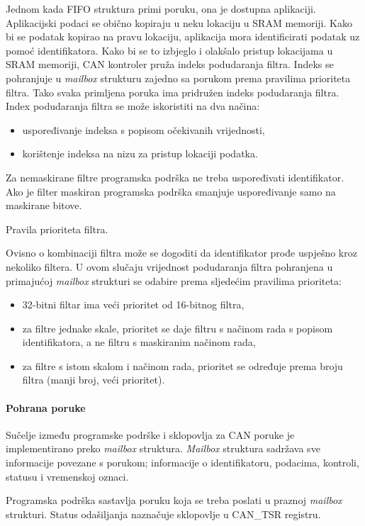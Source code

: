 Jednom kada FIFO struktura primi poruku, ona je dostupna aplikaciji. Aplikacijski podaci se obično kopiraju u neku lokaciju u SRAM memoriji. Kako bi se podatak kopirao na pravu lokaciju, aplikacija mora identificirati podatak uz pomoć identifikatora. Kako bi se to izbjeglo i olakšalo pristup lokacijama u SRAM memoriji, CAN kontroler pruža indeks podudaranja filtra. Indeks se pohranjuje u \textit{mailbox} strukturu zajedno sa porukom prema pravilima prioriteta filtra. Tako svaka primljena poruka ima pridružen indeks podudaranja filtra. Index podudaranja filtra se može iskoristiti na dva načina:
\begin{itemize}
	\item uspoređivanje indeksa s popisom očekivanih vrijednosti,
	\item korištenje indeksa na nizu za pristup lokaciji podatka.
\end{itemize}
Za nemaskirane filtre programska podrška ne treba uspoređivati identifikator. Ako je filter maskiran programska podrška smanjuje uspoređivanje samo na maskirane bitove.

Pravila prioriteta filtra.

Ovisno o kombinaciji filtra može se dogoditi da identifikator prođe uspješno kroz nekoliko filtera. U ovom slučaju vrijednost podudaranja filtra pohranjena u primajućoj \textit{mailbox} strukturi se odabire prema sljedećim pravilima prioriteta:
\begin{itemize}
	\item 32-bitni filtar ima veći prioritet od 16-bitnog filtra,
	\item za filtre jednake skale, prioritet se daje filtru s načinom rada s popisom identifikatora, a ne filtru s maskiranim načinom rada,
	\item za filtre s istom skalom i načinom rada, prioritet se određuje prema broju filtra (manji broj, veći prioritet).
\end{itemize}

\paragraph{Pohrana poruke}

Sučelje između programske podrške i sklopovlja za CAN poruke je implementirano preko \textit{mailbox} struktura. \textit{Mailbox} struktura sadržava sve informacije povezane s porukom; informacije o identifikatoru, podacima, kontroli, statusu i vremenskoj oznaci.

Programska podrška sastavlja poruku koja se treba poslati u praznoj \textit{mailbox} strukturi. Status odašiljanja naznačuje sklopovlje u CAN\_TSR registru.

